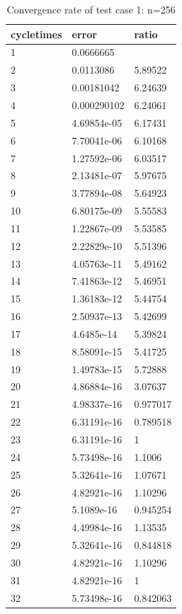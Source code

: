 \documentclass[UTF8]{ctexart}
\theoremstyle{plain}
\theoremstyle{definition}
\theoremstyle{remark}
\begin{document}
\begin{table}[H]
\centering
\begin{tabular}{|l|l|l|}
\hline
cycletimes & error & ratio\\\hline
1 & 0.0666665& \\ \hline
2 & 0.0113086& 5.89522\\ \hline
3 & 0.00181042& 6.24639\\ \hline
4 & 0.000290102& 6.24061\\ \hline
5 & 4.69854e-05& 6.17431\\ \hline
6 & 7.70041e-06& 6.10168\\ \hline
7 & 1.27592e-06& 6.03517\\ \hline
8 & 2.13481e-07& 5.97675\\ \hline
9 & 3.77894e-08& 5.64923\\ \hline
10 & 6.80175e-09& 5.55583\\ \hline
11 & 1.22867e-09& 5.53585\\ \hline
12 & 2.22829e-10& 5.51396\\ \hline
13 & 4.05763e-11& 5.49162\\ \hline
14 & 7.41863e-12& 5.46951\\ \hline
15 & 1.36183e-12& 5.44754\\ \hline
16 & 2.50937e-13& 5.42699\\ \hline
17 & 4.6485e-14& 5.39824\\ \hline
18 & 8.58091e-15& 5.41725\\ \hline
19 & 1.49783e-15& 5.72888\\ \hline
20 & 4.86884e-16& 3.07637\\ \hline
21 & 4.98337e-16& 0.977017\\ \hline
22 & 6.31191e-16& 0.789518\\ \hline
23 & 6.31191e-16& 1\\ \hline
24 & 5.73498e-16& 1.1006\\ \hline
25 & 5.32641e-16& 1.07671\\ \hline
26 & 4.82921e-16& 1.10296\\ \hline
27 & 5.1089e-16& 0.945254\\ \hline
28 & 4.49984e-16& 1.13535\\ \hline
29 & 5.32641e-16& 0.844818\\ \hline
30 & 4.82921e-16& 1.10296\\ \hline
31 & 4.82921e-16& 1\\ \hline
32 & 5.73498e-16& 0.842063\\ \hline
\end{tabular}
\caption{Convergence rate of test case 1: n=256}
\end{table}
\end{document}
